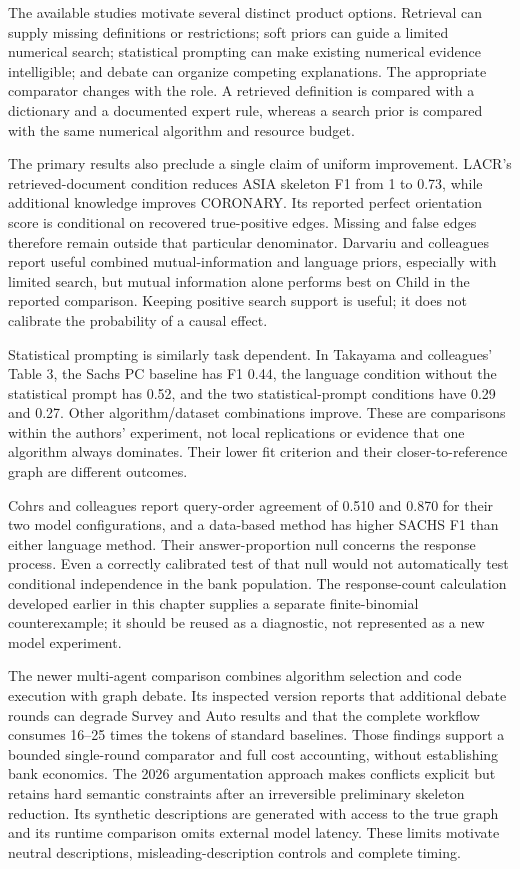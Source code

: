 The available studies motivate several distinct product options.
Retrieval can supply missing definitions or restrictions; soft priors
can guide a limited numerical search; statistical prompting can make
existing numerical evidence intelligible; and debate can organize
competing explanations. The appropriate comparator changes with the
role. A retrieved definition is compared with a dictionary and a
documented expert rule, whereas a search prior is compared with the same
numerical algorithm and resource budget.

The primary results also preclude a single claim of uniform improvement.
LACR's retrieved-document condition reduces ASIA skeleton F1 from 1 to
0.73, while additional knowledge improves CORONARY. Its reported perfect
orientation score is conditional on recovered true-positive edges.
Missing and false edges therefore remain outside that particular
denominator. \citep{v12_la_2402_15301} Darvariu and colleagues report
useful combined mutual-information and language priors, especially with
limited search, but mutual information alone performs best on Child in
the reported comparison. Keeping positive search support is useful; it
does not calibrate the probability of a causal effect.
\citep{v12_la_2405_13551}

Statistical prompting is similarly task dependent. In Takayama and
colleagues' Table 3, the Sachs PC baseline has F1 0.44, the language
condition without the statistical prompt has 0.52, and the two
statistical-prompt conditions have 0.29 and 0.27. Other
algorithm/dataset combinations improve. These are comparisons within the
authors' experiment, not local replications or evidence that one
algorithm always dominates. Their lower fit criterion and their
closer-to-reference graph are different outcomes.
\citep{v12_la_2402_01454}

Cohrs and colleagues report query-order agreement of 0.510 and 0.870 for
their two model configurations, and a data-based method has higher SACHS
F1 than either language method. Their answer-proportion null concerns
the response process. Even a correctly calibrated test of that null
would not automatically test conditional independence in the bank
population. \citep{v12_la_2406_07378} The response-count calculation
developed earlier in this chapter supplies a separate finite-binomial
counterexample; it should be reused as a diagnostic, not represented as
a new model experiment.

The newer multi-agent comparison combines algorithm selection and code
execution with graph debate. Its inspected version reports that
additional debate rounds can degrade Survey and Auto results and that
the complete workflow consumes 16--25 times the tokens of standard
baselines. Those findings support a bounded single-round comparator and
full cost accounting, without establishing bank economics.
\citep{v12_la_2407_15073} The 2026 argumentation approach makes
conflicts explicit but retains hard semantic constraints after an
irreversible preliminary skeleton reduction. Its synthetic descriptions
are generated with access to the true graph and its runtime comparison
omits external model latency. These limits motivate neutral
descriptions, misleading-description controls and complete timing.
\citep{exec14_expert_argumentation}

